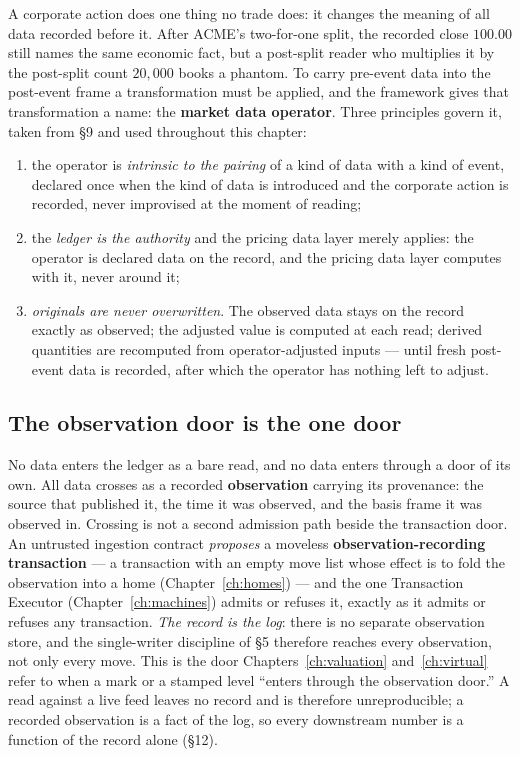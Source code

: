 A corporate action does one thing no trade does: it changes the meaning of all data
recorded before it. After ACME's two-for-one split, the recorded close $100.00$ still
names the same economic fact, but a post-split reader who multiplies it by the post-split
count $20{,}000$ books a phantom. To carry pre-event data into the post-event frame a
transformation must be applied, and the framework gives that transformation a name: the
\textbf{market data operator}. Three principles govern it, taken from \S 9 and used
throughout this chapter:

\begin{enumerate}[label=(\roman*),nosep,leftmargin=2.2em]
\item the operator is \emph{intrinsic to the pairing} of a kind of data with a kind of
  event, declared once when the kind of data is introduced and the corporate action is
  recorded, never improvised at the moment of reading;
\item the \emph{ledger is the authority} and the pricing data layer merely applies: the
  operator is declared data on the record, and the pricing data layer computes with it,
  never around it;
\item \emph{originals are never overwritten}. The observed data stays on the record
  exactly as observed; the adjusted value is computed at each read; derived quantities are
  recomputed from operator-adjusted inputs --- until fresh post-event data is recorded,
  after which the operator has nothing left to adjust.
\end{enumerate}

\subsection{The observation door is the one door}\label{sec:obs-door}

No data enters the ledger as a bare read, and no data enters through a door of its own.
All data crosses as a recorded \textbf{observation} carrying its provenance: the source
that published it, the time it was observed, and the basis frame it was observed in.
Crossing is not a second admission path beside the transaction door. An untrusted
ingestion contract \emph{proposes} a moveless \textbf{observation-recording transaction}
--- a transaction with an empty move list whose effect is to fold the observation into a
home (Chapter~\ref{ch:homes}) --- and the one Transaction Executor
(Chapter~\ref{ch:machines}) admits or refuses it, exactly as it admits or refuses any
transaction. \emph{The record is the log}: there is no separate observation store, and the
single-writer discipline of \S5 therefore reaches every observation, not only every move.
This is the door Chapters~\ref{ch:valuation} and~\ref{ch:virtual} refer to when a mark or
a stamped level ``enters through the observation door.'' A read against a live feed leaves
no record and is therefore unreproducible; a recorded observation is a fact of the log, so
every downstream number is a function of the record alone (\S 12).

